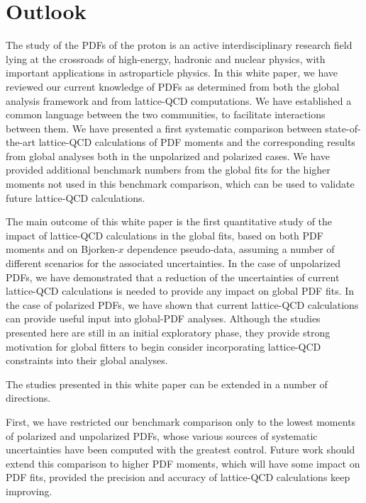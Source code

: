 \section{Outlook}
\label{sec:outlook}

The study of the PDFs of the proton is an active interdisciplinary research 
field lying at the crossroads of high-energy, hadronic and nuclear physics, 
with important applications in astroparticle physics.
%
In this white paper, we have reviewed our current knowledge of PDFs as
determined from both the global analysis framework
and from lattice-QCD computations. 
%
We have established a common language between the two communities, 
to facilitate interactions between them.
%
We have presented a first systematic comparison between state-of-the-art 
lattice-QCD calculations of PDF moments and the corresponding results from
global analyses both in the unpolarized and polarized cases.
%
We have provided additional benchmark numbers from the global fits 
for the higher moments not used in this benchmark comparison, which can be
used to validate future lattice-QCD calculations.

The main outcome of this white paper is the first
quantitative study of the impact of lattice-QCD calculations
in the global fits, based on both PDF moments and on Bjorken-$x$ dependence 
pseudo-data, assuming a number of different scenarios for
the associated uncertainties.
%
In the case of unpolarized PDFs, we have demonstrated that a reduction 
of the uncertainties of current lattice-QCD calculations is needed 
to provide any impact on global PDF fits.
%
In the case of polarized PDFs, we have shown that current lattice-QCD
calculations can provide useful input into global-PDF analyses.
%
Although the studies presented here are still in an initial exploratory phase, 
they provide strong motivation for global fitters to begin consider 
incorporating lattice-QCD constraints into their global analyses.

The studies presented in this white paper can be extended in a number of 
directions.

First, we have restricted our benchmark comparison only to the lowest moments 
of polarized and unpolarized PDFs, whose various sources of systematic 
uncertainties have been computed with the greatest control.
%
Future work should extend this comparison to higher PDF moments,
which will have some impact on PDF fits, provided the precision and accuracy
of lattice-QCD calculations keep improving.


